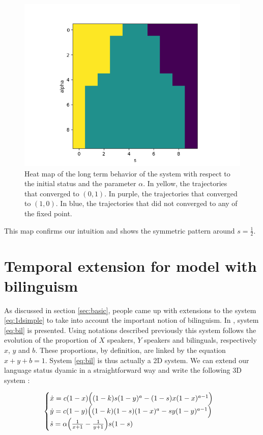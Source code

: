 \documentclass{article}
\begin{document}
\begin{figure}[H]
\centering
\includegraphics[scale=0.5]{convergence_heatmap.png}
\caption{Heat map of the long term behavior of the system with respect to the initial status and the parameter $\alpha$. In yellow, the trajectories that converged to $(0,1)$. In purple, the trajectories that converged to $(1,0)$. In blue, the trajectories that did not converged to any of the fixed point.}
\label{fig:heatmap}
\end{figure}

This map confirms our intuition and shows the symmetric pattern around $s=\frac{1}{2}$.

\section{Temporal extension for model with bilinguism}
\label{sec:2d}
As discussed in section \ref{sec:basic}, people came up with extensions to the system \ref{eq:1dsimple} to take into account the important notion of bilinguism.
In \cite{bilingual}, system \ref{eq:bil} is presented.
Using notations described previously this system follows the evolution of the proportion of $X$ speakers, $Y$ speakers and bilinguals, respectively $x$, $y$ and $b$.
These proportions, by definition, are linked by the equation $x+y+b = 1$.
System \ref{eq:bil} is thus actually a 2D system.
We can extend our language status dyamic in a straightforward way and write the following 3D system :

\begin{equation}
\label{eq:2d}
\begin{cases}
\dot{x} = c(1-x) \Big( (1-k)s(1-y)^a - (1-s)x(1-x)^{a-1} \Big) \\
\dot{y} = c(1-y) \Big( (1-k)(1-s)(1-x)^a - sy(1-y)^{a-1} \Big) \\
\dot{s} = \alpha \Big( \frac{1}{x+1} - \frac{1}{y+1}\Big) s (1-s) \\
\end{cases}
\end{equation}
\end{document}
